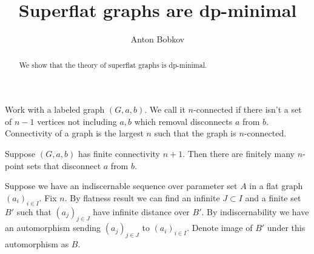 \documentclass{amsart}
\begin{document}
\title{Superflat graphs are dp-minimal}
\author{Anton Bobkov}

\begin{abstract}
	We show that the theory of superflat graphs is dp-minimal.
\end{abstract}

\maketitle

Work with a labeled graph $(G, a, b)$. We call it $n$-connected if there isn't a set of $n-1$ vertices not including $a,b$ which removal disconnects $a$ from $b$. Connectivity of a graph is the largest $n$ such that the graph is $n$-connected.

\begin{Lemma}
	Suppose $(G, a, b)$ has finite connectivity $n+1$. Then there are finitely many $n$-point sets that disconnect $a$ from $b$.
\end{Lemma}

Suppose we have an indiscernable sequence over parameter set $A$ in a flat graph $(a_i)_{i \in I}$. Fix $n$. By flatness result we can find an infinite $J \subset I$ and a finite set $B'$ such that $(a_j)_{j \in J}$ have infinite distance over $B'$. By indiscernability we have an automorphism sending $(a_j)_{j \in J}$ to $(a_i)_{i \in I}$. Denote image of $B'$ under this automorphism as $B$.
\end{document}
